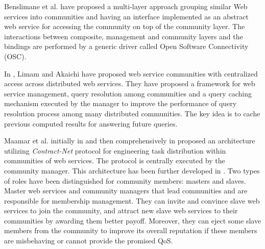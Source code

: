 \documentclass[10pt,journal,cspaper,compsoc]{IEEEtran}
\begin{document}
Benslimane et al. \cite{Liris-2770} have proposed a multi-layer
approach grouping similar Web services into communities and having
an interface implemented as an abstract web service for accessing
the community on top of the community layer. The interactions
between composite, management and community layers and the
bindings are performed by a generic driver called Open Software
Connectivity (OSC).

In \cite{managing-hela-jalel}, Limam and Akaichi have proposed web
service communities with centralized access across distributed web
services. They have proposed a framework for web service
management, query resolution among communities and a query caching
mechanism executed by the manager to improve the performance of
query resolution process among many distributed communities. The
key idea is to cache previous computed results for answering
future queries.


Maamar et al. initially in \cite{conf/webist/MaamarLBTS07} and
then comprehensively in \cite{DBLP:journals/ijebr/MaamarSTBB09}
proposed an architecture utilizing \emph{Contract-Net} protocol
for engineering task distribution within communities of web
services. The protocol is centrally executed by the community
manager. This architecture has been further developed in
\cite{CSTintercommunity, conf/IEEEscc/BenharrefSBB11,
conf/IEEEscc/KhosravifarBMMT10, conf/aina/LimTM11}. Two types of
roles have been distinguished for community members: masters and
slaves. Master web services and community managers that lead
communities and are responsible for membership management. They
can invite and convince slave web services to join the community,
and attract new slave web services to their communities by
awarding them better payoff. Moreover, they can eject some slave
members from the community to improve its overall reputation if
these members are misbehaving or cannot provide the promised QoS.
\end{document}
